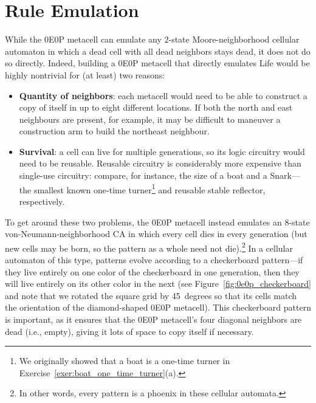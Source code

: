 \section{Rule Emulation}\label{sec:0e0p_rule_emulation}

While the 0E0P metacell can emulate any $2$-state Moore-neighborhood cellular automaton in which a dead cell with all dead neighbors stays dead, it does not do so directly. Indeed, building a 0E0P metacell that directly emulates Life would be highly nontrivial for (at least) two reasons:\smallskip

\begin{itemize}
	\item \textbf{Quantity of neighbors}: each metacell would need to be able to construct a copy of itself in up to eight different locations. If both the north and east neighbours are present, for example, it may be difficult to maneuver a construction arm to build the northeast neighbour.\smallskip
	
	\item \textbf{Survival}: a cell can live for multiple generations, so its logic circuitry would need to be reusable. Reusable circuitry is considerably more expensive than single-use circuitry: compare, for instance, the size of a boat and a Snark---the smallest known one-time turner\footnote{We originally showed that a boat is a one-time turner in Exercise~\ref{exer:boat_one_time_turner}(a).} and reusable stable reflector, respectively.\smallskip
\end{itemize}

To get around these two problems, the 0E0P metacell instead emulates an $8$-state von-Neumann-neighborhood CA in which every cell dies in every generation (but new cells may be born, so the pattern as a whole need not die).\footnote{In other words, every pattern is a phoenix in these cellular automata.} In a cellular automaton of this type, patterns evolve according to a checkerboard pattern---if they live entirely on one color of the checkerboard in one generation, then they will live entirely on its other color in the next (see Figure~\ref{fig:0e0p_checkerboard} and note that we rotated the square grid by 45~degrees so that its cells match the orientation of the diamond-shaped 0E0P metacell). This checkerboard pattern is important, as it ensures that the 0E0P metacell's four diagonal neighbors are dead (i.e., empty), giving it lots of space to copy itself if necessary.

